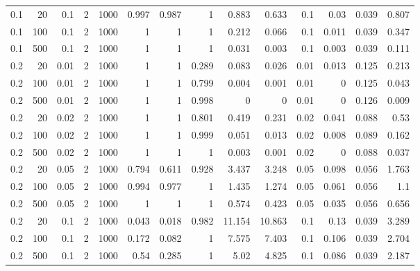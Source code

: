 \begin{table}[!htbp]
\begin{tabular}{lrrrrrrrrrrrrr}
0.1 & 20 & 0.1 & 2 & 1000 & 0.997 & 0.987 & 1 & 0.883 & 0.633 & 0.1 & 0.03 & 0.039 & 0.807 \\
0.1 & 100 & 0.1 & 2 & 1000 & 1 & 1 & 1 & 0.212 & 0.066 & 0.1 & 0.011 & 0.039 & 0.347 \\
0.1 & 500 & 0.1 & 2 & 1000 & 1 & 1 & 1 & 0.031 & 0.003 & 0.1 & 0.003 & 0.039 & 0.111 \\
0.2 & 20 & 0.01 & 2 & 1000 & 1 & 1 & 0.289 & 0.083 & 0.026 & 0.01 & 0.013 & 0.125 & 0.213 \\
0.2 & 100 & 0.01 & 2 & 1000 & 1 & 1 & 0.799 & 0.004 & 0.001 & 0.01 & 0 & 0.125 & 0.043 \\
0.2 & 500 & 0.01 & 2 & 1000 & 1 & 1 & 0.998 & 0 & 0 & 0.01 & 0 & 0.126 & 0.009 \\
0.2 & 20 & 0.02 & 2 & 1000 & 1 & 1 & 0.801 & 0.419 & 0.231 & 0.02 & 0.041 & 0.088 & 0.53 \\
0.2 & 100 & 0.02 & 2 & 1000 & 1 & 1 & 0.999 & 0.051 & 0.013 & 0.02 & 0.008 & 0.089 & 0.162 \\
0.2 & 500 & 0.02 & 2 & 1000 & 1 & 1 & 1 & 0.003 & 0.001 & 0.02 & 0 & 0.088 & 0.037 \\
0.2 & 20 & 0.05 & 2 & 1000 & 0.794 & 0.611 & 0.928 & 3.437 & 3.248 & 0.05 & 0.098 & 0.056 & 1.763 \\
0.2 & 100 & 0.05 & 2 & 1000 & 0.994 & 0.977 & 1 & 1.435 & 1.274 & 0.05 & 0.061 & 0.056 & 1.1 \\
0.2 & 500 & 0.05 & 2 & 1000 & 1 & 1 & 1 & 0.574 & 0.423 & 0.05 & 0.035 & 0.056 & 0.656 \\
0.2 & 20 & 0.1 & 2 & 1000 & 0.043 & 0.018 & 0.982 & 11.154 & 10.863 & 0.1 & 0.13 & 0.039 & 3.289 \\
0.2 & 100 & 0.1 & 2 & 1000 & 0.172 & 0.082 & 1 & 7.575 & 7.403 & 0.1 & 0.106 & 0.039 & 2.704 \\
0.2 & 500 & 0.1 & 2 & 1000 & 0.54 & 0.285 & 1 & 5.02 & 4.825 & 0.1 & 0.086 & 0.039 & 2.187 \\
\hline
\end{tabular}
\end{table}
